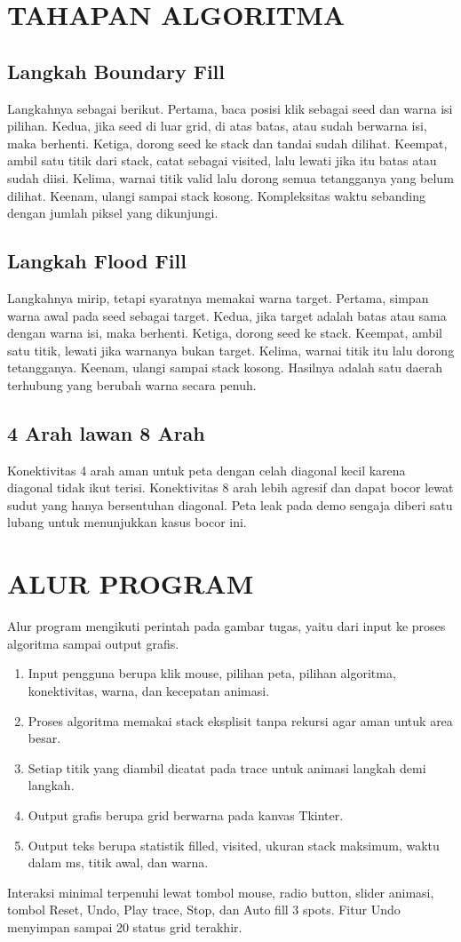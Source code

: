 ﻿\documentclass[12pt,a4paper]{article}
\begin{document}
\section{TAHAPAN ALGORITMA}
\subsection{Langkah Boundary Fill}
Langkahnya sebagai berikut. Pertama, baca posisi klik sebagai seed dan warna isi pilihan. Kedua, jika seed di luar grid, di atas batas, atau sudah berwarna isi, maka berhenti. Ketiga, dorong seed ke stack dan tandai sudah dilihat. Keempat, ambil satu titik dari stack, catat sebagai visited, lalu lewati jika itu batas atau sudah diisi. Kelima, warnai titik valid lalu dorong semua tetangganya yang belum dilihat. Keenam, ulangi sampai stack kosong. Kompleksitas waktu sebanding dengan jumlah piksel yang dikunjungi.
\subsection{Langkah Flood Fill}
Langkahnya mirip, tetapi syaratnya memakai warna target. Pertama, simpan warna awal pada seed sebagai target. Kedua, jika target adalah batas atau sama dengan warna isi, maka berhenti. Ketiga, dorong seed ke stack. Keempat, ambil satu titik, lewati jika warnanya bukan target. Kelima, warnai titik itu lalu dorong tetangganya. Keenam, ulangi sampai stack kosong. Hasilnya adalah satu daerah terhubung yang berubah warna secara penuh.
\subsection{4 Arah lawan 8 Arah}
Konektivitas 4 arah aman untuk peta dengan celah diagonal kecil karena diagonal tidak ikut terisi. Konektivitas 8 arah lebih agresif dan dapat bocor lewat sudut yang hanya bersentuhan diagonal. Peta leak pada demo sengaja diberi satu lubang untuk menunjukkan kasus bocor ini.
\section{ALUR PROGRAM}
Alur program mengikuti perintah pada gambar tugas, yaitu dari input ke proses algoritma sampai output grafis.
\begin{enumerate}
\item Input pengguna berupa klik mouse, pilihan peta, pilihan algoritma, konektivitas, warna, dan kecepatan animasi.
\item Proses algoritma memakai stack eksplisit tanpa rekursi agar aman untuk area besar.
\item Setiap titik yang diambil dicatat pada trace untuk animasi langkah demi langkah.
\item Output grafis berupa grid berwarna pada kanvas Tkinter.
\item Output teks berupa statistik filled, visited, ukuran stack maksimum, waktu dalam ms, titik awal, dan warna.
\end{enumerate}
Interaksi minimal terpenuhi lewat tombol mouse, radio button, slider animasi, tombol Reset, Undo, Play trace, Stop, dan Auto fill 3 spots. Fitur Undo menyimpan sampai 20 status grid terakhir.
\end{document}
